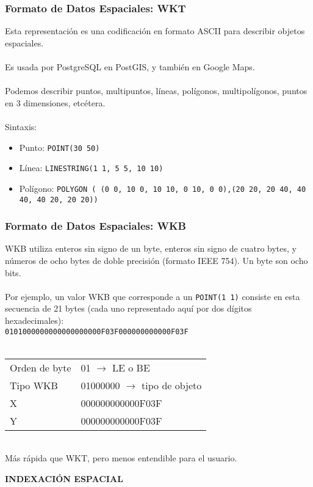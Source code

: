 \documentclass[12pt]{beamer}
\begin{document}
\begin{frame}
\frametitle{Formato de Datos Espaciales: WKT}
Esta representaci\'on es una codificaci\'on en formato ASCII para describir objetos espaciales.\\
\ \\
Es usada por PostgreSQL en PostGIS, y tambi\'en en Google Maps.\\
\ \\
Podemos describir puntos, multipuntos, l\'ineas, pol\'igonos, multipol\'igonos, puntos en 3 dimensiones, etc\'etera.\\
\ \\
Sintaxis:\\
\begin{itemize}
\item Punto: \texttt{POINT(30 50)}
\item L\'inea: \texttt{LINESTRING(1 1, 5 5, 10 10)}
\item Pol\'igono: \texttt{POLYGON ( (0 0, 10 0, 10 10, 0 10, 0 0),(20 20, 20 40, 40 40, 40 20, 20 20))}
\end{itemize}
\end{frame}

\begin{frame}
\frametitle{Formato de Datos Espaciales: WKB}
WKB utiliza enteros sin signo de un byte, enteros sin signo de cuatro bytes, y n\'umeros de ocho bytes de doble precisi\'on (formato IEEE 754). Un byte son ocho bits.\\
\ \\
Por ejemplo, un valor WKB que corresponde a un \texttt{POINT(1 1)} consiste en esta secuencia de 21 bytes (cada uno representado aquí por dos d\'igitos hexadecimales):\\
\texttt{0101000000000000000000F03F000000000000F03F}\\
\ \\
\begin{tabular}{l l}
Orden de byte & 01 $\rightarrow$ LE o BE\\
Tipo WKB	  & 01000000 $\rightarrow$ tipo de objeto\\
X & 000000000000F03F\\
Y & 000000000000F03F\\
\end{tabular}\\
M\'as r\'apida que WKT, pero menos entendible para el usuario.
\end{frame}

\begin{frame}
\begin{center}
\textbf{INDEXACI\'ON ESPACIAL}
\end{center}
\end{frame}
\end{document}
